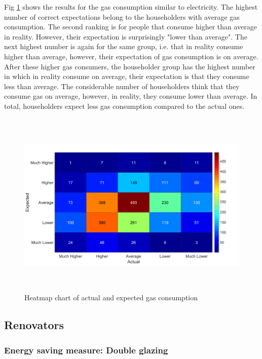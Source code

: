 \documentclass[preprint,12pt,3p]{elsarticle}
\begin{document}
Fig \ref{fig:10} shows the results for the gas consumption similar to electricity. The highest number of correct expectations belong to the householders with average gas consumption. The second ranking is for people that consume higher than average in reality. However, their expectation is surprisingly "lower than average". The next highest number is again for the same group, i.e. that in reality consume higher than average, however, their expectation of gas consumption is on average. After these higher gas consumers, the householder group has the highest number in which in reality consume on average, their expectation is that they consume less than average.  The considerable number of householders think that they consume gas on average, however, in reality, they consume lower than average. In total, householders expect less gas consumption compared to the actual ones. 


\begin{figure}[H]
    \centering
    \includegraphics[width=15cm, height=9cm, clip]{Gas.png}
    \caption{Heatmap chart of actual and expected gas consumption}
    \label{fig:10}
\end{figure}


\subsection{Renovators}

\subsubsection{Energy saving measure: Double glazing}
\end{document}
